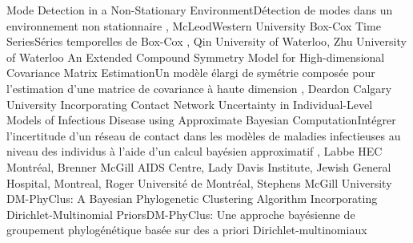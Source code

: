 
{
}
{Mode Detection in a Non-Stationary Environment}{Détection de modes dans un environnement non stationnaire }
{\bubbleE \enspace \screenE}
{
,  {McLeod}{Western University}
}
{Box-Cox Time Series}{Séries temporelles de Box-Cox}
{\bubbleE \enspace \screenE}
{
,  {Qin}
{University of Waterloo},  {Zhu}
{University of Waterloo}
}
{An Extended Compound Symmetry Model for High-dimensional Covariance Matrix Estimation}{Un modèle élargi de symétrie composée pour l’estimation d’une matrice de covariance à haute dimension}
{\bubbleE \enspace \screenE}
{
,  {Deardon}
{Calgary University}
}
{Incorporating Contact Network Uncertainty in Individual-Level Models of Infectious Disease using Approximate Bayesian Computation}{Intégrer l’incertitude d’un réseau de contact dans les modèles de maladies infectieuses au niveau des individus à l’aide d’un calcul bayésien approximatif}
{\bubbleE \enspace \screenE}
{
,  {Labbe}
{HEC Montréal},  {Brenner}
{McGill AIDS Centre, Lady Davis Institute, Jewish General Hospital, Montreal},  {Roger}
{Université de Montréal},  {Stephens}
{McGill University}
}
{DM-PhyClus: A Bayesian Phylogenetic Clustering Algorithm Incorporating Dirichlet-Multinomial Priors}{DM-PhyClus: Une approche bayésienne de groupement phylogénétique basée sur des a priori Dirichlet-multinomiaux}
{\bubbleE \enspace \screenE}


